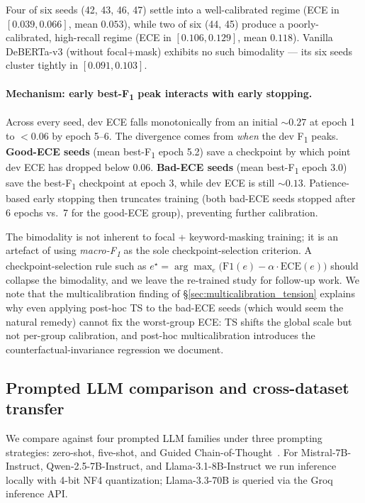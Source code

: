 \documentclass[10pt,a4paper]{article}
\begin{document}
Four of six seeds (42, 43, 46, 47) settle into a well-calibrated regime (ECE in $[0.039, 0.066]$, mean $0.053$), while two of six (44, 45) produce a poorly-calibrated, high-recall regime (ECE in $[0.106, 0.129]$, mean $0.118$). Vanilla DeBERTa-v3 (without focal+mask) exhibits no such bimodality --- its six seeds cluster tightly in $[0.091, 0.103]$.

\paragraph{Mechanism: early best-F\textsubscript{1} peak interacts with early stopping.}
Across every seed, dev ECE falls monotonically from an initial $\sim 0.27$ at epoch 1 to $< 0.06$ by epoch 5--6. The divergence comes from \emph{when} the dev F\textsubscript{1} peaks. \textbf{Good-ECE seeds} (mean best-F\textsubscript{1} epoch 5.2) save a checkpoint by which point dev ECE has dropped below $0.06$. \textbf{Bad-ECE seeds} (mean best-F\textsubscript{1} epoch 3.0) save the best-F\textsubscript{1} checkpoint at epoch 3, while dev ECE is still $\sim 0.13$. Patience-based early stopping then truncates training (both bad-ECE seeds stopped after 6 epochs vs.\ 7 for the good-ECE group), preventing further calibration.

The bimodality is not inherent to focal + keyword-masking training; it is an artefact of using \emph{macro-F\textsubscript{1}} as the sole checkpoint-selection criterion. A checkpoint-selection rule such as $e^\star = \arg\max_e \big( \mathrm{F1}(e) - \alpha \cdot \mathrm{ECE}(e) \big)$ should collapse the bimodality, and we leave the re-trained study for follow-up work. We note that the multicalibration finding of \S\ref{sec:multicalibration_tension} explains why even applying post-hoc TS to the bad-ECE seeds (which would seem the natural remedy) cannot fix the worst-group ECE: TS shifts the global scale but not per-group calibration, and post-hoc multicalibration introduces the counterfactual-invariance regression we document.

\subsection{Prompted LLM comparison and cross-dataset transfer}
\label{sec:llm_and_transfer}

We compare against four prompted LLM families under three prompting strategies: zero-shot, five-shot, and Guided Chain-of-Thought~\citep{patel2025evaluating}. For Mistral-7B-Instruct, Qwen-2.5-7B-Instruct, and Llama-3.1-8B-Instruct we run inference locally with 4-bit NF4 quantization; Llama-3.3-70B is queried via the Groq inference API.
\end{document}
